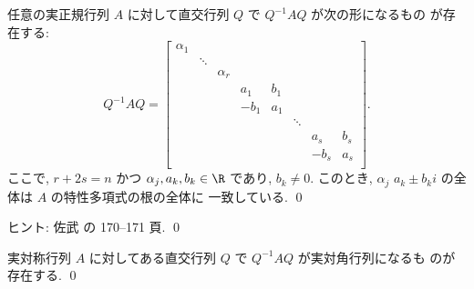 \documentclass[12pt,twoside]{jarticle}
\begin{document}
\begin{question}
\label{q:real-Toeplitz}
  任意の実正規行列 $A$ に対して直交行列 $Q$ で $Q^{-1}AQ$ が次の形になるもの
  が存在する:
  \begin{equation*}
    Q^{-1}AQ =
    \begin{bmatrix}
      \alpha_1 &        &          &       &     &        &       &     \\
               & \ddots &          &       &     &        &       &     \\
               &        & \alpha_r &       &     &        &       &     \\
               &        &          &   a_1 & b_1 &        &       &     \\
               &        &          & - b_1 & a_1 &        &       &     \\
               &        &          &       &     & \ddots &       &     \\
               &        &          &       &     &        &   a_s & b_s \\
               &        &          &       &     &        & - b_s & a_s \\
    \end{bmatrix}.
  \end{equation*}
  ここで, $r+2s=n$ かつ $\alpha_j,a_k,b_k\in\R$ であり, $b_k\ne 0$. 
  このとき, $\alpha_j$ $a_k \pm b_k i$ の全体は $A$ の特性多項式の根の全体に
  一致している.  \qed
\end{question}

\noindent
ヒント: 佐武 \cite{satake} の 170--171 頁.
\qed


\begin{question}[実対称行列の対角化, 10点]
\label{q:real-symmetric}
  実対称行列 $A$ に対してある直交行列 $Q$ で $Q^{-1}AQ$ が実対角行列になるも
  のが存在する. \qed
\end{question}

\end{document}
